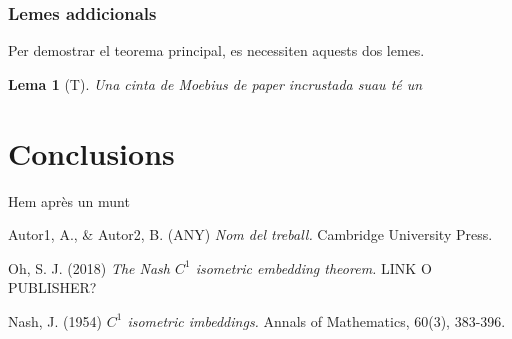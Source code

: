 \documentclass[11pt,a4paper,openright,oneside]{book}
\numberwithin{equation}{section}
\newtheorem{lema}[teo]{Lema}
\theoremstyle{definition}
\begin{document}
\subsection{Lemes addicionals}
Per demostrar el teorema principal, es necessiten aquests dos lemes.
\begin{lema}[T]\label{lema T}
    Una cinta de Moebius de paper incrustada suau té un  

\end{lema}
\newpage
\chapter{Conclusions}

Hem après un munt

\normalfont

\newpage

\begin{thebibliography}{25}

Autor1, A., \& Autor2, B. (ANY)
\newblock \textit{Nom del treball.}
\newblock Cambridge University Press.

Oh, S. J. (2018)
\newblock \textit{The Nash $C^1$ isometric embedding theorem.}
\newblock LINK O PUBLISHER?

Nash, J. (1954)
\newblock \textit{$C^1$ isometric imbeddings.}
\newblock Annals of Mathematics, 60(3), 383-396.

\end{thebibliography}
\end{document}
